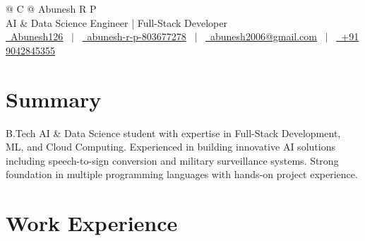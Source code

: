 \documentclass[a4paper,12pt]{article}
\begin{document}
\pagestyle{empty} 



\begin{tabularx}{\linewidth}{@{} C @{}}
\Huge{Abunesh R P} \\[5pt]
\normalsize{AI \& Data Science Engineer | Full-Stack Developer} \\[3pt]
\href{https://github.com/Abunesh126}{\raisebox{-0.05\height}\faGithub\ Abunesh126} \ $|$ \ 
\href{https://linkedin.com/in/abunesh-r-p-803677278}{\raisebox{-0.05\height}\faLinkedin\ abunesh-r-p-803677278} \ $|$ \ 
\href{mailto:abunesh2006@gmail.com}{\raisebox{-0.05\height}\faEnvelope \ abunesh2006@gmail.com} \ $|$ \ 
\href{tel:+919042845355}{\raisebox{-0.05\height}\faMobile \ +91 9042845355} \\
\end{tabularx}


\section{Summary}
B.Tech AI \& Data Science student with expertise in Full-Stack Development, ML, and Cloud Computing. Experienced in building innovative AI solutions including speech-to-sign conversion and military surveillance systems. Strong foundation in multiple programming languages with hands-on project experience.

\section{Work Experience}
\end{document}
